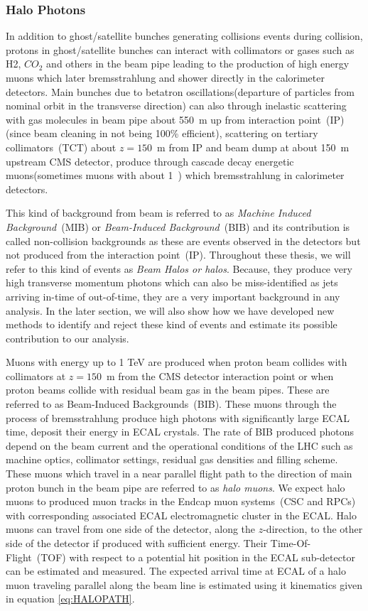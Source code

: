 \subsubsection{Halo Photons}
   In addition to ghost/satellite bunches generating collisions events during collision, protons in ghost/satellite bunches can interact with collimators or gases such as H2, $CO_{2}$ and others in the beam pipe leading to the production of high energy muons which later bremsstrahlung and shower directly in the calorimeter detectors. 
Main bunches due to betatron oscillations(departure of particles from nominal orbit in the transverse direction) can also through inelastic scattering with gas molecules in beam pipe about 550~m up from interaction  point~(IP)(since beam cleaning in not being 100\% efficient), scattering on tertiary collimators~(TCT) about $z = 150$~m from IP and beam dump at about 150~m upstream CMS detector, produce through cascade decay energetic muons(sometimes muons with about 1~\TeV) which bremsstrahlung in calorimeter detectors. 

This kind of background from beam is referred to as \textit{Machine Induced Background}~(MIB) or \textit{Beam-Induced Background}~(BIB) and its contribution is called non-collision backgrounds as these are events observed in the detectors but not produced from the interaction point~(IP). Throughout these thesis, we will refer to this kind of events as \textit{Beam Halos or halos}. Because, they produce very high transverse momentum photons which can also be miss-identified as jets arriving in-time of out-of-time, they are a very important background in any analysis. In the later section, we will also show how we have developed new methods to identify and reject these kind of events and estimate its possible contribution to our analysis.


Muons with energy up to 1 TeV are produced when proton beam collides with collimators at $z = 150$~m from the CMS detector interaction point or when proton beams collide with residual beam gas in the beam pipes. These are referred to as  Beam-Induced Backgrounds~(BIB). These muons through the process of bremsstrahlung produce high \pt photons with significantly large ECAL time, deposit their energy in ECAL crystals. The rate of BIB produced photons depend on the beam current and the operational conditions of the LHC such as machine optics, collimator settings, residual gas densities and filling scheme. These muons which travel in a near parallel flight path to the direction of main proton bunch in the beam pipe are referred to as \textit{halo muons}. We expect halo muons to produced muon tracks in the Endcap muon systems~(CSC and RPCs) with corresponding associated ECAL electromagnetic cluster in the ECAL. Halo muons can travel from one side of the detector, along the $z$-direction, to the other side of the detector if produced with sufficient energy. Their Time-Of-Flight~(TOF) with respect to a potential hit position in the ECAL sub-detector can be estimated and measured.
The expected arrival time at ECAL of a halo muon traveling parallel along the beam line is estimated using it kinematics given in equation \ref{eq:HALOPATH}.

